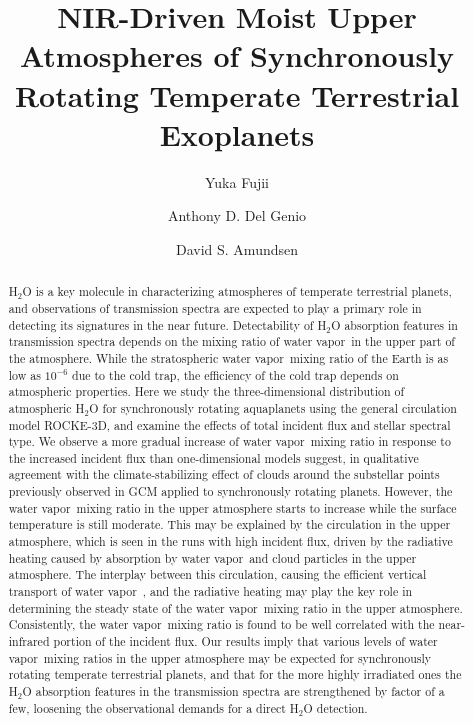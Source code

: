 \documentclass[11pt,numberedappendix,twocolappendix,]{emulateapj}
\def\water{H$_2$O }
\newcommand{\wv}{{\color{orange}water vapor\ }}
\begin{document}
\title{NIR-Driven Moist Upper Atmospheres of Synchronously Rotating Temperate Terrestrial Exoplanets}
\author{Yuka Fujii}
\author{Anthony D. Del Genio}
\author{David S. Amundsen}

\begin{abstract}

\water is a key molecule in characterizing atmospheres of temperate terrestrial planets, and observations of transmission spectra are expected to play a primary role in detecting its signatures in the near future. 
%
Detectability of \water absorption features in transmission spectra depends on the mixing ratio of \wv in the upper part of the atmosphere. 
%
While the stratospheric \wv mixing ratio of the Earth is as low as $10^{-6}$ due to the cold trap, the efficiency of the cold trap depends on atmospheric properties. 
%
Here we study the three-dimensional distribution of atmospheric \water for synchronously rotating aquaplanets using the general circulation model ROCKE-3D, and examine the effects of total incident flux and stellar spectral type.  
%
We observe a more gradual increase of \wv mixing ratio in response to the increased incident flux than one-dimensional models suggest, in qualitative agreement with the climate-stabilizing effect of clouds around the substellar points previously observed in GCM applied to synchronously rotating planets. 
%
However, the \wv mixing ratio in the upper atmosphere starts to increase  while the surface temperature is still moderate. 
%
This may be explained by the circulation in the upper atmosphere, which is seen in the runs with high incident flux, driven by the radiative heating caused by absorption by \wv and cloud particles in the upper atmosphere. 
%
The interplay between this circulation, causing the efficient vertical transport of \wv, and the radiative heating may play the key role in determining the steady state of the \wv mixing ratio in the upper atmosphere. 
%
Consistently, the \wv mixing ratio is found to be well correlated with the near-infrared portion of the incident flux. 
%
Our results imply that various levels of \wv mixing ratios in the upper atmosphere may be expected for synchronously rotating temperate terrestrial planets, and that for the more highly irradiated ones the \water absorption features in the transmission spectra are strengthened by factor of a few, loosening the observational demands for a direct \water detection. 
%
\end{abstract}
\end{document}

